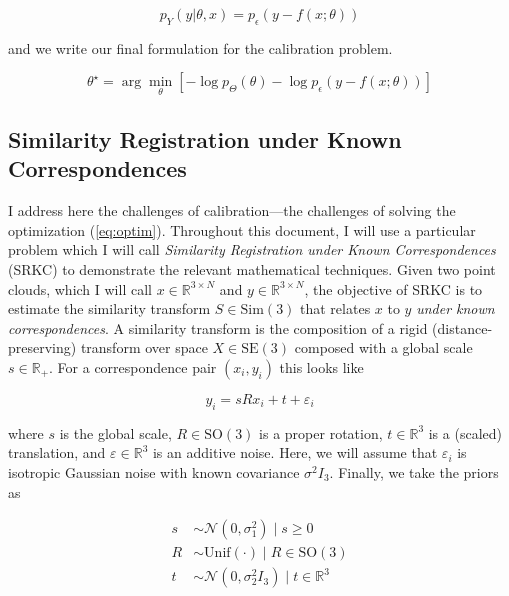 \documentclass[conference]{IEEEtran}
\begin{document}
\begin{equation}
	p_Y(y | \theta, x) = p_\epsilon(y - f(x; \theta))
\end{equation}

and we write our final formulation for the calibration problem.

\begin{equation}
	\boxed{\theta^\star = \arg\min_\theta \left[ - \log p_\Theta(\theta) - \log p_\epsilon(y - f(x; \theta)) \right]}
	\label{eq:optim}
\end{equation}

\subsection{Similarity Registration under Known Correspondences}

I address here the challenges of calibration---the challenges of solving the optimization (\ref{eq:optim}).  Throughout this document, I will use a particular problem which I will call \textit{Similarity Registration under Known Correspondences} (SRKC) to demonstrate the relevant mathematical techniques.  Given two point clouds, which I will call \( x \in \mathbb{R}^{3 \times N} \) and \( y \in \mathbb{R}^{3 \times N} \), the objective of SRKC is to estimate the similarity transform \( S \in \mathrm{Sim(3)} \) that relates \( x \) to \( y \) \textit{under known correspondences}.  A similarity transform is the composition of a rigid (distance-preserving) transform over space \( X \in \mathrm{SE(3)} \) composed with a global scale \( s \in \mathbb{R}_+ \).  For a correspondence pair \( (x_i, y_i) \) this looks like

\begin{equation}
	y_i = s R x_i + t + \varepsilon_i
\end{equation}

where \( s \) is the global scale, \( R \in \mathrm{SO(3)} \) is a proper rotation, \( t \in \mathbb{R}^3 \) is a (scaled) translation, and \( \varepsilon \in \mathbb{R}^3 \) is an additive noise.  Here, we will assume that \( \varepsilon_i \) is isotropic Gaussian noise with known covariance \( \sigma^2 I_3 \).  Finally, we take the priors as

\begin{align}
	s &\sim \mathcal{N}(0, \sigma_1^2) \; | \; s \ge 0 \\
	R &\sim \mathrm{Unif}(\cdot) \; | \; R \in \mathrm{SO(3)} \\
	t &\sim \mathcal{N}(0, \sigma_2^2 I_3) \; | \; t \in \mathbb{R}^3
\end{align}
\end{document}
